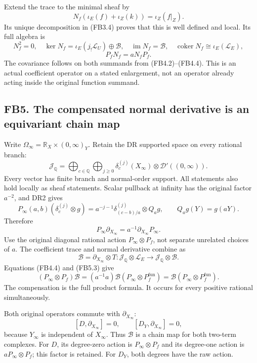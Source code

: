 Extend the trace to the minimal sheaf by \[
N_f(\iota_E(f)+\iota_Z(k))=\iota_Z(f|_Z).
\tag{FB4.7}
\] Its unique decomposition in (FB3.4) proves that this is well defined
and local. Its full algebra is \[
N_f^2=0,\quad
\ker N_f=\iota_E(j_!\mathscr L_U)\oplus\mathscr B,\quad
\operatorname{im}N_f=\mathscr B,\quad
\operatorname{coker}N_f\cong\iota_E(\mathscr L_E),
\] \[
P_fN_f=aN_fP_f.
\tag{FB4.8}
\] The covariance follows on both summands from (FB4.2)--(FB4.4). This
is an actual coefficient operator on a stated enlargement, not an
operator already acting inside the original function summand.

\subsection{FB5. The compensated normal derivative is an equivariant
chain
map}\label{fb5.-the-compensated-normal-derivative-is-an-equivariant-chain-map}

Write \(\Omega_\infty=\mathbb R_X\times(0,\infty)_Y\). Retain the DR
supported space on every rational branch: \[
\mathcal J_{\mathbb Q}
=\bigoplus_{c\in\mathbb Q}\bigoplus_{j\ge0}
\delta_c^{(j)}(X_\infty)\otimes\mathcal D'((0,\infty)).
\tag{FB5.1}
\] Every vector has finite branch and normal-order support. All
statements also hold locally as sheaf statements. Scalar pullback at
infinity has the original factor \(a^{-2}\), and DR2 gives \[
P_\infty(a,b)(\delta_c^{(j)}\otimes g)
=a^{-j-1}\delta_{(c-b)/a}^{(j)}\otimes Q_ag,\qquad
Q_ag(Y)=g(aY).
\tag{FB5.2}
\] Therefore \[
P_\infty\partial_{X_\infty}
=a^{-1}\partial_{X_\infty}P_\infty.
\tag{FB5.3}
\] Use the original diagonal rational action \(P_\infty\otimes P_f\),
not separate unrelated choices of \(a\). The coefficient trace and
normal derivative combine as \[
\boxed{\mathcal B=\partial_{X_\infty}\otimes T:
\mathcal J_{\mathbb Q}\otimes\mathscr L_E
\longrightarrow\mathcal J_{\mathbb Q}\otimes\mathscr B.}
\tag{FB5.4}
\] Equations (FB4.4) and (FB5.3) give \[
(P_\infty\otimes P_f)\mathcal B
=(a^{-1}a)\mathcal B(P_\infty\otimes P_f^{\mathrm{fun}})
=\mathcal B(P_\infty\otimes P_f^{\mathrm{fun}}).
\tag{FB5.5}
\] The compensation is the full product formula. It occurs for every
positive rational simultaneously.

Both original operators commute with \(\partial_{X_\infty}\): \[
[D,\partial_{X_\infty}]=0,\qquad
[D_Y,\partial_{X_\infty}]=0,
\tag{FB5.6}
\] because \(Y_\infty\) is independent of \(X_\infty\). Thus
\(\mathcal B\) is a chain map for both two-term complexes. For \(D\),
its degree-zero action is \(P_\infty\otimes P_f\) and its degree-one
action is \(aP_\infty\otimes P_f\); this factor is retained. For
\(D_Y\), both degrees have the raw action.

